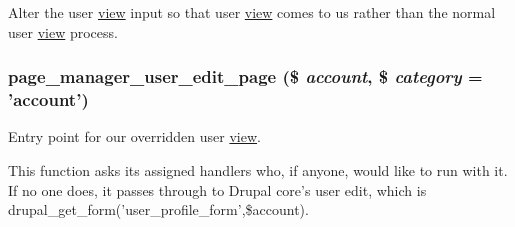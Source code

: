 Alter the user \hyperlink{classview}{view} input so that user \hyperlink{classview}{view} comes to us rather than the normal user \hyperlink{classview}{view} process. \hypertarget{page__manager_2plugins_2tasks_2user__edit_8inc_abbda6f20e41f20d21543a539cbdb907f}{
\subsubsection[{page\_\-manager\_\-user\_\-edit\_\-page}]{\setlength{\rightskip}{0pt plus 5cm}page\_\-manager\_\-user\_\-edit\_\-page (\$ {\em account}, \/  \$ {\em category} = {\ttfamily 'account'})}}
\label{page__manager_2plugins_2tasks_2user__edit_8inc_abbda6f20e41f20d21543a539cbdb907f}
Entry point for our overridden user \hyperlink{classview}{view}.

This function asks its assigned handlers who, if anyone, would like to run with it. If no one does, it passes through to Drupal core's user edit, which is drupal\_\-get\_\-form('user\_\-profile\_\-form',\$account). 